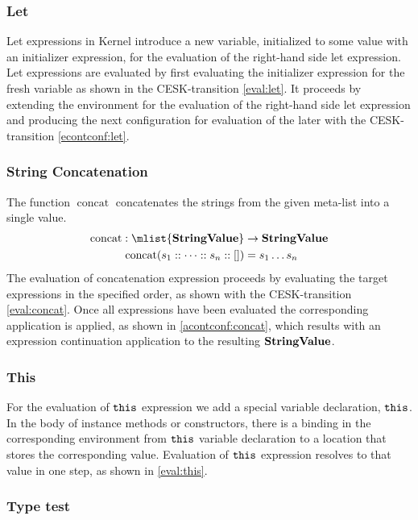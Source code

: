 \documentclass[a4paper,oneside]{article}
\DeclareMathOperator{\concat}{concat}
\begin{document}
\subsubsection{Let}

Let expressions in Kernel introduce a new variable, initialized to some value with an initializer expression, for the evaluation of the right-hand side let expression.
Let expressions are evaluated by first evaluating the initializer expression for the fresh variable as shown in the CESK-transition \eqref{eval:let}.
It proceeds by extending the environment for the evaluation of the right-hand side let expression and producing the next configuration for evaluation of the later with the CESK-transition \eqref{econtconf:let}.


\subsubsection{String Concatenation}
\label{subsubsec:string-concatenation}

The function $\concat$ concatenates the strings from the given meta-list into a single value.
\begin{align*}
  \concat : \mlist{\dstring} &\rightarrow \dstring\\
  \concat( s_1 :: \dots :: s_n :: []) &= s_1 \dots s_n
\end{align*}
The evaluation of concatenation expression proceeds by evaluating the target expressions in the specified order, as shown with the CESK-transition \eqref{eval:concat}.
Once all expressions have been evaluated the corresponding application is applied, as shown in \eqref{acontconf:concat}, which results with an expression continuation application to the resulting $\mathbf{StringValue}$.


\subsubsection{This}

For the evaluation of $\tt{this}$ expression we add a special variable declaration, $\tt{this}$.
In the body of instance methods or constructors, there is a binding in the corresponding environment from $\tt{this}$ variable declaration to a location that stores the corresponding value.
Evaluation of $\tt{this}$ expression resolves to that value in one step, as shown in \eqref{eval:this}.


\subsubsection{Type test}
\label{subsubsec:type-test}
\end{document}
